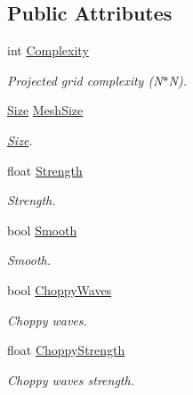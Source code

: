 \subsection*{Public Attributes}
\begin{CompactItemize}
\item 
int \hyperlink{struct_hydrax_1_1_module_1_1_simple_grid_1_1_options_3ccaa20a5351a3bd3e743f179a347e4f}{Complexity}
\begin{CompactList}\small\item\em Projected grid complexity (N$\ast$N). \item\end{CompactList}\item 
\hyperlink{struct_hydrax_1_1_size}{Size} \hyperlink{struct_hydrax_1_1_module_1_1_simple_grid_1_1_options_bb708bb0feb25558278a50492f593f0b}{MeshSize}
\begin{CompactList}\small\item\em \hyperlink{struct_hydrax_1_1_size}{Size}. \item\end{CompactList}\item 
float \hyperlink{struct_hydrax_1_1_module_1_1_simple_grid_1_1_options_35fd961ca7eeb63127378321c6b205a0}{Strength}
\begin{CompactList}\small\item\em Strength. \item\end{CompactList}\item 
bool \hyperlink{struct_hydrax_1_1_module_1_1_simple_grid_1_1_options_3b26b3400f42d6e753f5e00e7b7a8180}{Smooth}
\begin{CompactList}\small\item\em Smooth. \item\end{CompactList}\item 
bool \hyperlink{struct_hydrax_1_1_module_1_1_simple_grid_1_1_options_9cd5aefce26c64d689ee441431d47cc9}{ChoppyWaves}
\begin{CompactList}\small\item\em Choppy waves. \item\end{CompactList}\item 
float \hyperlink{struct_hydrax_1_1_module_1_1_simple_grid_1_1_options_2eda0cfbbe201148b3f3287ce4a91055}{ChoppyStrength}
\begin{CompactList}\small\item\em Choppy waves strength. \item\end{CompactList}\end{CompactItemize}


